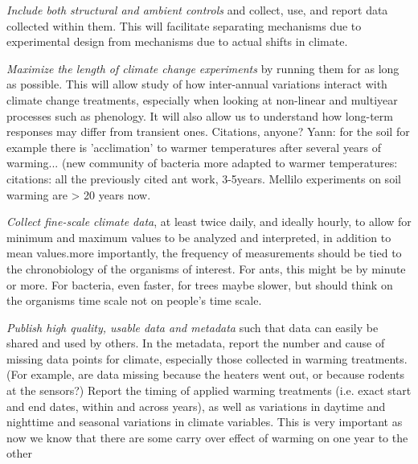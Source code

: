 \documentclass{article}
\begin{document}
\par\textit{Include both structural and ambient controls} and collect, use, and report data collected within them. This will facilitate separating mechanisms due to experimental design from mechanisms due to actual shifts in climate.  
\par\textit{Maximize the length of climate change experiments} by running them for as long as possible. This will allow study of how inter-annual variations interact with climate change treatments, especially when looking at non-linear and multiyear processes such as phenology. It will also allow us to understand how long-term responses may differ from  transient ones. Citations, anyone? Yann: for the soil for example there is 'acclimation' to warmer temperatures after several years of warming... (new community of bacteria more adapted to warmer temperatures:
citations: all the previously cited ant work, 3-5years. Mellilo experiments on soil warming are > 20 years now. %
\par\textit{Collect fine-scale climate data}, at least twice daily, and ideally hourly, to allow for minimum and maximum values to be analyzed and interpreted, in addition to mean values.more importantly, the frequency of measurements should be tied to the chronobiology of the organisms of interest. For ants, this might be by minute or more. For bacteria, even faster, for trees maybe slower, but should think on the organisms time scale not on people's time scale.
 \par\textit{Publish high quality, usable data and metadata} such that data can easily be shared and used by others. In the metadata, report the number and cause of missing data points for climate, especially those collected in warming treatments. (For example, are data missing because the heaters went out, or because rodents at the sensors?) Report the timing of applied warming treatments (i.e. exact start and end dates, within and across years), as well as variations in daytime and nighttime and seasonal variations in climate variables. This is very important as now we know that there are some carry over effect of warming on one year to the other 
\end{document}
